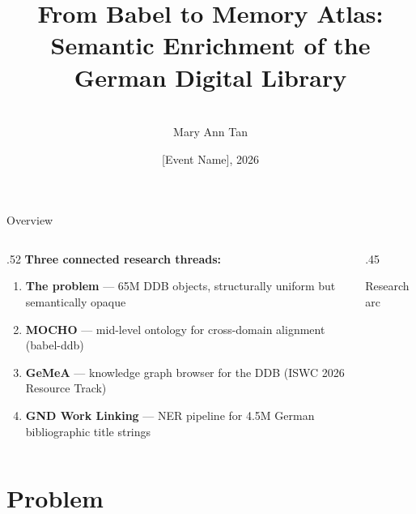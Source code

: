 \documentclass[xcolor,aspectratio=169,compress]{beamer}
\title[DDB Research Arc]{From Babel to Memory Atlas:\\
  Semantic Enrichment of the German Digital Library}
\author[M.A.\ Tan]{
  \\[.8cm]
  Mary Ann Tan}
\institute[FIZ-KDAI]{FIZ Karlsruhe -- Leibniz Institute for Information Infrastructure, KDAI}
\date[IWT, 2026]{[Event Name], 2026}
\begin{document}
\frame[plain]{\titlepage}

\begin{frame}{Overview}
  \begin{columns}
    \begin{column}{.52\textwidth}
      \textbf{Three connected research threads:}
      \smallskip
      \begin{enumerate}\setlength{\itemsep}{6pt}
        \item \textbf{The problem} --- 65M DDB objects,
              structurally uniform but semantically opaque
        \item \textbf{MOCHO} --- mid-level ontology for
              cross-domain alignment (babel-ddb)
        \item \textbf{GeMeA} --- knowledge graph browser
              for the DDB (ISWC 2026 Resource Track)
        \item \textbf{GND Work Linking} --- NER pipeline
              for 4.5M German bibliographic title strings
      \end{enumerate}
    \end{column}
    \begin{column}{.45\textwidth}
      \begin{block}{Research arc}
        \begin{center}
        \end{center}
      \end{block}
    \end{column}
  \end{columns}
\end{frame}

\section{Problem}
\end{document}
